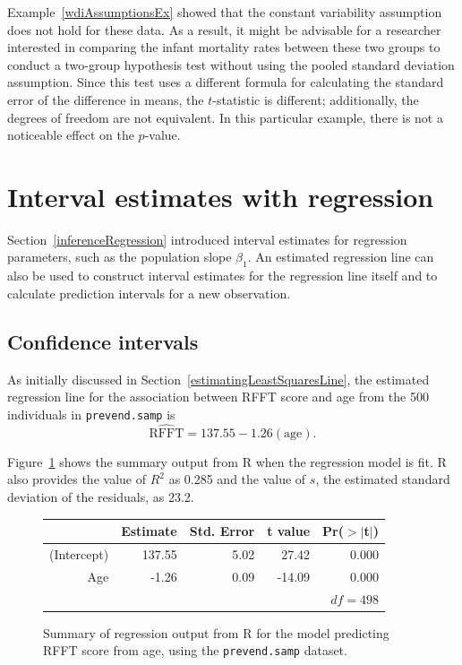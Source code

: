 Example~\ref{wdiAssumptionsEx} showed that the constant variability assumption does not hold for these data. As a result, it might be advisable for a researcher interested in comparing the infant mortality rates between these two groups to conduct a two-group hypothesis test without using the pooled standard deviation assumption. Since this test uses a different formula for calculating the standard error of the difference in means, the $t$-statistic is different; additionally, the degrees of freedom are not equivalent. In this particular example, there is not a noticeable effect on the $p$-value.


\section{Interval estimates with regression}
\label{confidencePredictionIntervalsSimpleRegression}

Section~\ref{inferenceRegression} introduced interval estimates for regression parameters, such as the population slope $\beta_1$. An estimated regression line can also be used to construct interval estimates for the regression line itself and to calculate prediction intervals for a new observation.

\subsection{Confidence intervals}

As initially discussed in Section~\ref{estimatingLeastSquaresLine}, the estimated regression line for the association between RFFT score and age from the 500 individuals in \texttt{prevend.samp} is
\[\widehat{\text{RFFT}} = 137.55 - 1.26(\text{age}). \]

Figure~\ref{table:ageRFFTLeastSquares} shows the summary output from \textsf{R} when the regression model is fit. \textsf{R} also provides the value of $R^2$ as 0.285 and the value of $s$, the estimated standard deviation of the residuals, as 23.2.

\begin{figure}[h]
	\begin{center}
	\begin{tabular}{rrrrr}
		\hline
		& Estimate  & Std. Error    & t value   & Pr($>$$|$t$|$) \\ 
		\hline
		(Intercept)     & 137.55   & 5.02       & 27.42     & 0.000\\ 
		Age  & -1.26    & 0.09      & -14.09    & 0.000 \\ 
		\hline
		\multicolumn{5}{r}{$df = 498$} \\
	\end{tabular}
  	\end{center}
	\caption{Summary of regression output from \textsf{R} for the model predicting RFFT score from age, using the \texttt{prevend.samp} dataset.}
	\label{table:ageRFFTLeastSquares}
\end{figure}


